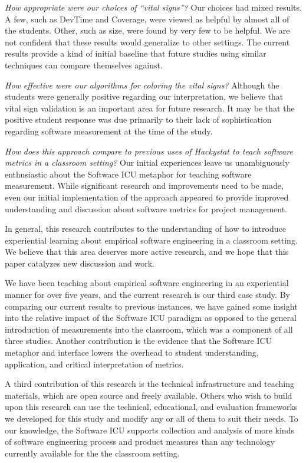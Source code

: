 \documentclass[10pt,twocolumn]{article}
\begin{document}
{\em How appropriate were our choices of ``vital signs''?} Our choices had
mixed results.  A few, such as DevTime and Coverage, were viewed as helpful
by almost all of the students.  Other, such as size, were found by very few
to be helpful.  We are not confident that these results would generalize to
other settings.  The current results provide a kind of initial baseline
that future studies using similar techniques can compare themselves
against.

{\em How effective were our algorithms for coloring the vital signs?}
Although the students were generally positive regarding our interpretation,
we believe that vital sign validation is an important area for future
research.  It may be that the positive student response was due primarily
to their lack of sophistication regarding software measurement at the time
of the study.

{\em How does this approach compare to previous uses of Hackystat to teach
software metrics in a classroom setting?}  Our initial experiences leave us
unambiguously enthusiastic about the Software ICU metaphor for teaching
software measurement. While significant research and improvements need to
be made, even our initial implementation of the approach appeared to
provide improved understanding and discussion about software metrics for
project management.

\label{sec:conclusions}


In general, this research contributes to the understanding of how to
introduce experiential learning about empirical software engineering in a
classroom setting.  We believe that this area deserves more active
research, and we hope that this paper catalyzes new discussion and work.

We have been teaching about empirical software engineering in an
experiential manner for over five years, and the current research is our
third case study.  By comparing our current results to previous instances,
we have gained some insight into the relative impact of the Software ICU
paradigm as opposed to the general introduction of measurements into the
classroom, which was a component of all three studies.  Another
contribution is the evidence that the Software ICU metaphor and interface
lowers the overhead to student understanding, application, and critical
interpretation of metrics.

A third contribution of this research is the technical infrastructure and
teaching materials, which are open source and freely available.  Others who
wish to build upon this research can use the technical, educational, and
evaluation frameworks we developed for this study and modify any or all of
them to suit their needs.  To our knowledge, the Software ICU supports
collection and analysis of more kinds of software engineering process and
product measures than any technology currently available for the the
classroom setting.
\end{document}
